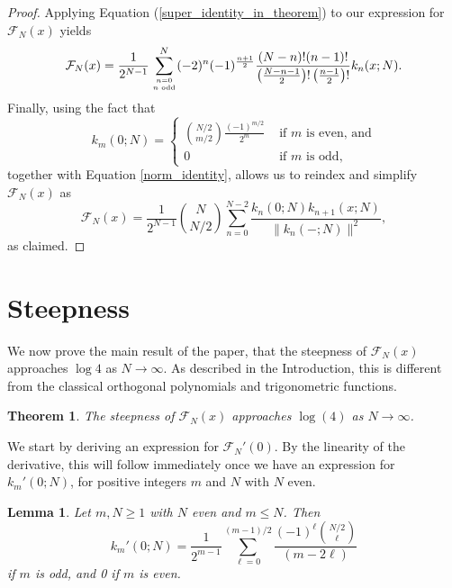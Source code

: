 \documentclass{amsart}
\theoremstyle{plain}
\newtheorem{thm}[equation]{Theorem}
\newtheorem{lem}[equation]{Lemma}
\theoremstyle{remark}
\begin{document}
\begin{proof}
Applying Equation (\ref{super_identity_in_theorem}) to our expression for $\mathcal{F}_N(x)$ yields
\[
\mathcal{F}_N(x) = \frac{1}{2^{N-1}} \sum_{n=0 \atop n \text{ odd}}^{N}  (-2)^n(-1)^{\frac{n+1}{2}} \frac{(N-n)!(n-1)!}{\left( \frac{N-n-1}{2}\right)! \left(\frac{n-1}{2} \right)!} k_n(x;N).
\]
Finally, using the fact that 
\[
k_m(0;N) = \begin{cases} \binom{N/2}{m/2}\frac{(-1)^{m/2}}{2^{m}} & \text{ if $m$ is even, and} \\
0 & \text{ if $m$ is odd},
\end{cases} 
\]
together with Equation \ref{norm_identity}, allows us to reindex and simplify $\mathcal{F}_N(x)$ as
\[
\mathcal{F}_{N}(x) = \frac{1}{2^{N-1}}\binom{N}{N/2}\sum_{n=0}^{N-2} \frac{k_n(0;N)k_{n+1}(x;N)}{\| k_n(-;N)\|^2},
\]
as claimed.
\end{proof}

\section{Steepness} \label{steepness_section}

We now prove the main result of the paper, that the steepness of $\mathcal{F}_N(x)$ approaches $\log 4$ as $N \to \infty$.  As described in the Introduction, this is different from the classical orthogonal polynomials and trigonometric functions. 

\begin{thm} \label{steepness_thm}
The steepness of $\mathcal{F}_N(x)$ approaches $\log(4)$ as $N \to \infty$.
\end{thm}

We start by deriving an expression for $\mathcal{F}_N'(0)$.  By the linearity of the derivative, this will follow immediately once we have an expression for $k_m'(0;N)$, for positive integers $m$ and $N$ with $N$ even.

\begin{lem} \label{Krawtchouk_steepness}
Let $m,N \geq 1$ with $N$ even and $m \leq N$.  Then 
\[
k_m'(0;N) = \frac{1}{2^{m-1}}\sum_{\ell = 0}^{(m-1)/2} \frac{(-1)^\ell  \binom{N/2}{\ell}}{(m-2\ell)}
\]
if $m$ is odd, and 0 if $m$ is even.
\end{lem}
\end{document}
